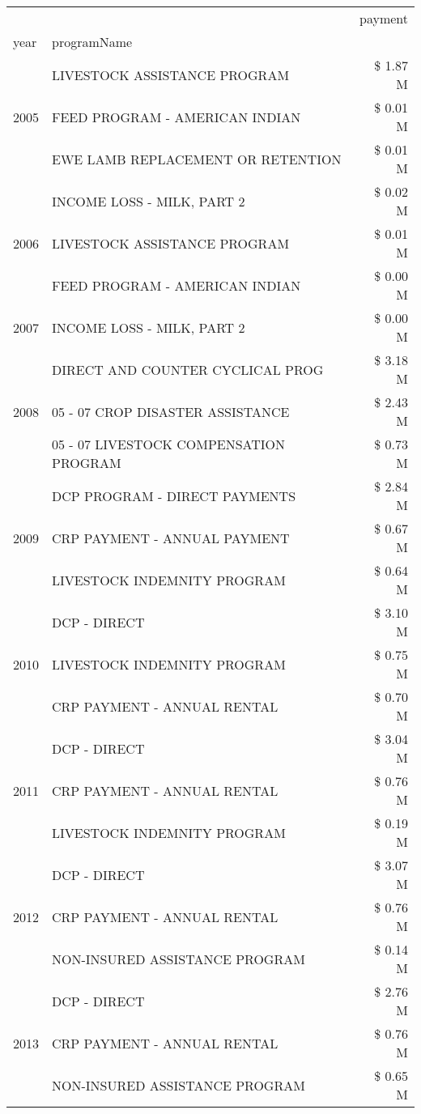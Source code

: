 \begin{tabular}{llr}
\toprule
 &  & payment \\
year & programName &  \\
\midrule
\multirow[t]{3}{*}{2005} & LIVESTOCK ASSISTANCE PROGRAM & \$ 1.87 M \\
 & FEED PROGRAM - AMERICAN INDIAN & \$ 0.01 M \\
 & EWE LAMB REPLACEMENT OR RETENTION & \$ 0.01 M \\
\cline{1-3}
\multirow[t]{3}{*}{2006} & INCOME LOSS - MILK, PART 2 & \$ 0.02 M \\
 & LIVESTOCK ASSISTANCE PROGRAM & \$ 0.01 M \\
 & FEED PROGRAM - AMERICAN INDIAN & \$ 0.00 M \\
\cline{1-3}
2007 & INCOME LOSS - MILK, PART 2 & \$ 0.00 M \\
\cline{1-3}
\multirow[t]{3}{*}{2008} & DIRECT AND COUNTER CYCLICAL PROG & \$ 3.18 M \\
 & 05 - 07 CROP DISASTER ASSISTANCE & \$ 2.43 M \\
 & 05 - 07 LIVESTOCK COMPENSATION PROGRAM & \$ 0.73 M \\
\cline{1-3}
\multirow[t]{3}{*}{2009} & DCP PROGRAM - DIRECT PAYMENTS & \$ 2.84 M \\
 & CRP PAYMENT - ANNUAL PAYMENT & \$ 0.67 M \\
 & LIVESTOCK INDEMNITY PROGRAM & \$ 0.64 M \\
\cline{1-3}
\multirow[t]{3}{*}{2010} & DCP - DIRECT & \$ 3.10 M \\
 & LIVESTOCK INDEMNITY PROGRAM & \$ 0.75 M \\
 & CRP PAYMENT - ANNUAL RENTAL & \$ 0.70 M \\
\cline{1-3}
\multirow[t]{3}{*}{2011} & DCP - DIRECT & \$ 3.04 M \\
 & CRP PAYMENT - ANNUAL RENTAL & \$ 0.76 M \\
 & LIVESTOCK INDEMNITY PROGRAM & \$ 0.19 M \\
\cline{1-3}
\multirow[t]{3}{*}{2012} & DCP - DIRECT & \$ 3.07 M \\
 & CRP PAYMENT - ANNUAL RENTAL & \$ 0.76 M \\
 & NON-INSURED ASSISTANCE PROGRAM & \$ 0.14 M \\
\cline{1-3}
\multirow[t]{3}{*}{2013} & DCP - DIRECT & \$ 2.76 M \\
 & CRP PAYMENT - ANNUAL RENTAL & \$ 0.76 M \\
 & NON-INSURED ASSISTANCE PROGRAM & \$ 0.65 M \\

\end{tabular}
